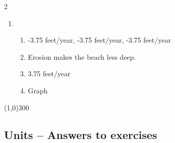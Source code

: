 \begin{multicols} {2}
\begin{enumerate}
\begin{enumerate}
\end{enumerate}

\item %
\begin{enumerate}
\item -3.75 feet/year, -3.75 feet/year, -3.75 feet/year
\item Erosion makes the beach less deep.
\item 3.75 feet/year
\item Graph
\end{enumerate}

\end{enumerate}
\end{multicols}

\begin{center}
\line(1,0){300} %
\end{center}

\subsection {Units -- Answers to exercises} %

